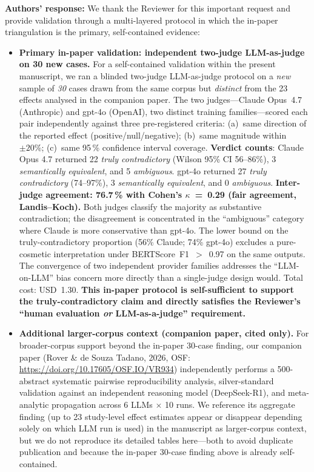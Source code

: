 \documentclass[11pt,a4paper]{article}
\newcommand{\response}[1]{\par\noindent\textbf{\color{revgreen}Authors' response:} #1\par}
\begin{document}
\response{We thank the Reviewer for this important request and provide validation through a multi-layered protocol in which the in-paper triangulation is the primary, self-contained evidence:

\begin{itemize}[leftmargin=*]
  \item \textbf{Primary in-paper validation: independent two-judge LLM-as-judge on 30 new cases.} For a self-contained validation within the present manuscript, we ran a blinded two-judge LLM-as-judge protocol on a \emph{new} sample of \emph{30} cases drawn from the same corpus but \emph{distinct} from the 23 effects analysed in the companion paper. The two judges---Claude Opus~4.7 (Anthropic) and gpt-4o (OpenAI), two distinct training families---scored each pair independently against three pre-registered criteria: (a)~same direction of the reported effect (positive/null/negative); (b)~same magnitude within $\pm 20\%$; (c)~same 95\,\% confidence interval coverage. \textbf{Verdict counts}: Claude Opus 4.7 returned 22 \emph{truly contradictory} (Wilson 95\% CI 56--86\%), 3 \emph{semantically equivalent}, and 5 \emph{ambiguous}. gpt-4o returned 27 \emph{truly contradictory} (74--97\%), 3 \emph{semantically equivalent}, and 0 \emph{ambiguous}. \textbf{Inter-judge agreement: 76.7\,\% with Cohen's $\kappa$~=~0.29 (fair agreement, Landis--Koch).} Both judges classify the majority as substantive contradiction; the disagreement is concentrated in the ``ambiguous'' category where Claude is more conservative than gpt-4o. The lower bound on the truly-contradictory proportion (56\% Claude; 74\% gpt-4o) excludes a pure-cosmetic interpretation under BERTScore~F1~$>$~0.97 on the same outputs. The convergence of two independent provider families addresses the ``LLM-on-LLM'' bias concern more directly than a single-judge design would. Total cost: USD~1.30. \textbf{This in-paper protocol is self-sufficient to support the truly-contradictory claim and directly satisfies the Reviewer's ``human evaluation \emph{or} LLM-as-a-judge'' requirement.}
  \item \textbf{Additional larger-corpus context (companion paper, cited only).} For broader-corpus support beyond the in-paper 30-case finding, our companion paper (Rover \& de Souza Tadano, 2026, OSF: \url{https://doi.org/10.17605/OSF.IO/VR934}) independently performs a 500-abstract systematic pairwise reproducibility analysis, silver-standard validation against an independent reasoning model (DeepSeek-R1), and meta-analytic propagation across 6 LLMs $\times$ 10 runs. We reference its aggregate finding (up to 23 study-level effect estimates appear or disappear depending solely on which LLM run is used) in the manuscript as larger-corpus context, but we do not reproduce its detailed tables here---both to avoid duplicate publication and because the in-paper 30-case finding above is already self-contained.

\end{itemize}}
\end{document}
